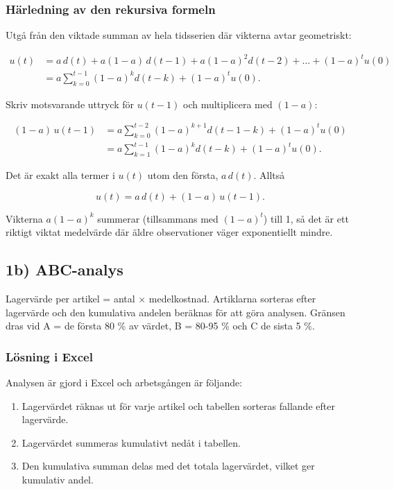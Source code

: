 \documentclass[11pt]{article}
\providecommand{\tightlist}{%
      \setlength{\itemsep}{0pt}\setlength{\parskip}{0pt}}
\begin{document}
    
    \subsubsection{Härledning av den rekursiva
formeln}\label{huxe4rledning-av-den-rekursiva-formeln}

Utgå från den viktade summan av hela tidsserien där vikterna avtar
geometriskt:

\[\begin{aligned}u(t) &= a\,d(t) + a(1-a)\,d(t-1) + a(1-a)^2 d(t-2) + \dots + (1-a)^t u(0) \\
&= a\sum_{k=0}^{t-1}(1-a)^k d(t-k) + (1-a)^t u(0).\end{aligned} \tag{4}\]

Skriv motsvarande uttryck för \(u(t-1)\) och multiplicera med \((1-a)\):

\[\begin{aligned}(1-a)\,u(t-1) &= a\sum_{k=0}^{t-2}(1-a)^{k+1} d(t-1-k) + (1-a)^t u(0) \\
&= a\sum_{k=1}^{t-1}(1-a)^{k} d(t-k) + (1-a)^t u(0).\end{aligned} \tag{5}\]

Det är exakt alla termer i \(u(t)\) utom den första, \(a\,d(t)\). Alltså

\[u(t) = a\,d(t) + (1-a)\,u(t-1). \tag{6}\]

Vikterna \(a(1-a)^k\) summerar (tillsammans med \((1-a)^t\)) till 1, så
det är ett riktigt viktat medelvärde där äldre observationer väger
exponentiellt mindre.

    \subsection{1b) ABC-analys}\label{b-abc-analys}

Lagervärde per artikel = antal \(\times\) medelkostnad. Artiklarna
sorteras efter lagervärde och den kumulativa andelen beräknas för att
göra analysen. Gränsen dras vid A = de första 80 \% av värdet, B = 80-95
\% och C de sista 5 \%.

    \subsubsection{Lösning i Excel}\label{luxf6sning-i-excel}

Analysen är gjord i Excel och arbetsgången är följande:

\begin{enumerate}
\def\labelenumi{\arabic{enumi}.}
\tightlist
\item
  Lagervärdet räknas ut för varje artikel och tabellen sorteras fallande
  efter lagervärde.
\item
  Lagervärdet summeras kumulativt nedåt i tabellen.
\item
  Den kumulativa summan delas med det totala lagervärdet, vilket ger
  kumulativ andel.
\end{enumerate}
\end{document}
